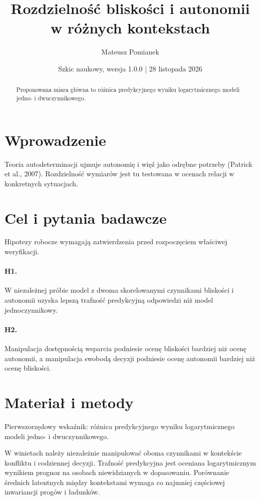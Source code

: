\documentclass[11pt,a4paper]{article}
\title{Rozdzielność bliskości i autonomii w różnych kontekstach}
\author{Mateusz Pomianek}
\date{Szkic naukowy, wersja 1.0.0 | 28 listopada 2026}
\begin{document}
\maketitle

\begin{abstract}

Proponowana miara główna to różnica predykcyjnego wyniku logarytmicznego modeli jedno- i dwuczynnikowego.

\end{abstract}

\section{Wprowadzenie}

Teoria autodeterminacji ujmuje autonomię i więź jako odrębne potrzeby (Patrick et al., 2007). Rozdzielność wymiarów jest tu testowana w ocenach relacji w konkretnych sytuacjach.

\section{Cel i pytania badawcze}

Hipotezy robocze wymagają zatwierdzenia przed rozpoczęciem właściwej weryfikacji.

\paragraph{H1.} W niezależnej próbie model z dwoma skorelowanymi czynnikami bliskości i autonomii uzyska lepszą trafność predykcyjną odpowiedzi niż model jednoczynnikowy.

\paragraph{H2.} Manipulacja dostępnością wsparcia podniesie ocenę bliskości bardziej niż ocenę autonomii, a manipulacja swobodą decyzji podniesie ocenę autonomii bardziej niż ocenę bliskości.

\section{Materiał i metody}

Pierwszorzędowy wskaźnik: różnica predykcyjnego wyniku logarytmicznego modeli jedno- i dwuczynnikowego.

W winietach należy niezależnie manipulować oboma czynnikami w kontekście konfliktu i codziennej decyzji. Trafność predykcyjna jest oceniana logarytmicznym wynikiem prognoz na osobach niewidzianych w dopasowaniu. Porównanie średnich latentnych między kontekstami wymaga co najmniej częściowej inwariancji progów i ładunków.
\end{document}
